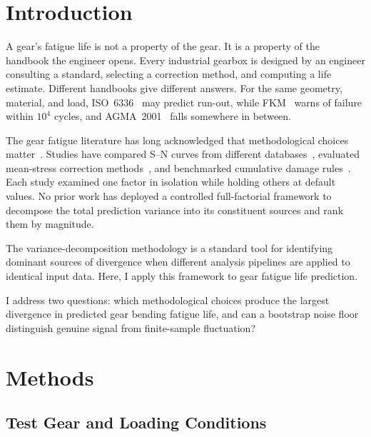 \documentclass[12pt,a4paper]{article}
\begin{document}
\section{Introduction}
\label{sec:intro}

A gear's fatigue life is not a property of the gear. It is a property
of the handbook the engineer opens. Every industrial gearbox is designed
by an engineer consulting a standard, selecting a correction method, and
computing a life estimate. Different handbooks give different answers.
For the same geometry, material, and load, ISO~6336~\cite{iso6336} may
predict run-out, while FKM~\cite{fkm} warns of failure within $10^4$
cycles, and AGMA~2001~\cite{agma2001} falls somewhere in between.

The gear fatigue literature has long acknowledged that methodological
choices matter~\cite{stephens2001, dowling2013}. Studies have compared
S--N curves from different databases~\cite{waterloo_fde}, evaluated
mean-stress correction methods~\cite{dowling2009}, and benchmarked
cumulative damage rules~\cite{fatemi1998}. Each study examined one
factor in isolation while holding others at default values. No prior
work has deployed a controlled full-factorial framework to decompose
the total prediction variance into its constituent sources and rank
them by magnitude.

The variance-decomposition methodology is a standard tool for identifying
dominant sources of divergence when different analysis pipelines are
applied to identical input data. Here, I apply this framework to
gear fatigue life prediction.

I address two questions: which methodological choices produce the
largest divergence in predicted gear bending fatigue life, and can a
bootstrap noise floor distinguish genuine signal from finite-sample
fluctuation?

\section{Methods}
\label{sec:methods}

\subsection{Test Gear and Loading Conditions}
\end{document}

